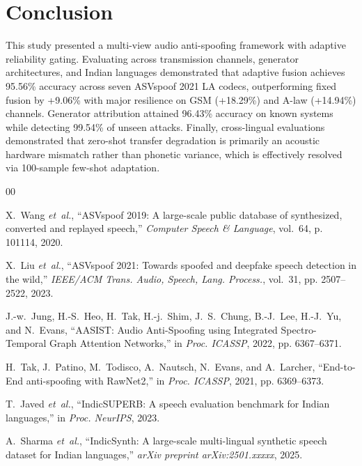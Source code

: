 \documentclass[conference]{IEEEtran}
\begin{document}
\section{Conclusion}
This study presented a multi-view audio anti-spoofing framework with adaptive reliability gating. Evaluating across transmission channels, generator architectures, and Indian languages demonstrated that adaptive fusion achieves 95.56\% accuracy across seven ASVspoof 2021 LA codecs, outperforming fixed fusion by +9.06\% with major resilience on GSM (+18.29\%) and A-law (+14.94\%) channels. Generator attribution attained 96.43\% accuracy on known systems while detecting 99.54\% of unseen attacks. Finally, cross-lingual evaluations demonstrated that zero-shot transfer degradation is primarily an acoustic hardware mismatch rather than phonetic variance, which is effectively resolved via 100-sample few-shot adaptation.

\begin{thebibliography}{00}

X.~Wang \emph{et~al.}, ``ASVspoof 2019: A large-scale public database of synthesized, converted and replayed speech,'' \emph{Computer Speech \& Language}, vol.~64, p. 101114, 2020.

X.~Liu \emph{et~al.}, ``ASVspoof 2021: Towards spoofed and deepfake speech detection in the wild,'' \emph{IEEE/ACM Trans. Audio, Speech, Lang. Process.}, vol.~31, pp. 2507--2522, 2023.

J.-w.~Jung, H.-S.~Heo, H.~Tak, H.-j.~Shim, J.~S.~Chung, B.-J.~Lee, H.-J.~Yu, and N.~Evans, ``AASIST: Audio Anti-Spoofing using Integrated Spectro-Temporal Graph Attention Networks,'' in \emph{Proc. ICASSP}, 2022, pp. 6367--6371.

H.~Tak, J.~Patino, M.~Todisco, A.~Nautsch, N.~Evans, and A.~Larcher, ``End-to-End anti-spoofing with RawNet2,'' in \emph{Proc. ICASSP}, 2021, pp. 6369--6373.

T.~Javed \emph{et~al.}, ``IndicSUPERB: A speech evaluation benchmark for Indian languages,'' in \emph{Proc. NeurIPS}, 2023.

A.~Sharma \emph{et~al.}, ``IndicSynth: A large-scale multi-lingual synthetic speech dataset for Indian languages,'' \emph{arXiv preprint arXiv:2501.xxxxx}, 2025.

\end{thebibliography}
\end{document}
